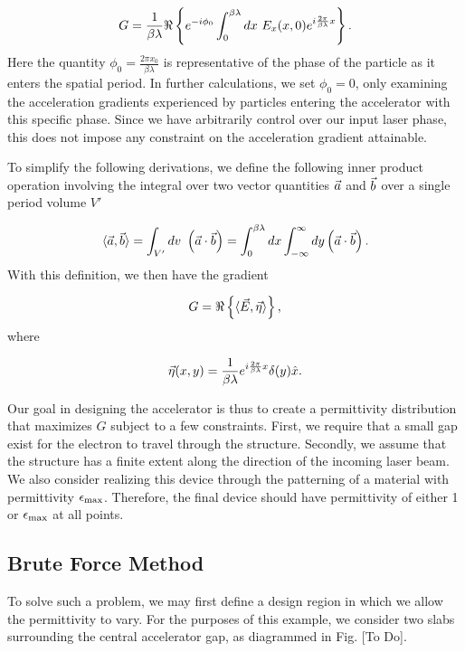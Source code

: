 \begin{equation}
G = \frac{1}{\beta\lambda}\real{ e^{-i\phi_0}\int_0^{\beta\lambda}{dx \ }E_x(x,0)e^{i\frac{2\pi}{\beta\lambda}x}}.
\end{equation}
%
Here the quantity $\phi_0 = \frac{2\pi x_0}{\beta\lambda}$ is representative of the phase of the particle as it enters the spatial period.
In further calculations, we set $\phi_0 = 0$, only examining the acceleration gradients experienced by particles entering the accelerator with this specific phase.
Since we have arbitrarily control over our input laser phase, this does not impose any constraint on the acceleration gradient attainable.

To simplify the following derivations, we define the following inner product operation involving the integral over two vector quantities $\vec{a}$ and $\vec{b}$ over a single period volume $V'$

\begin{equation}
 \langle \vec{a} , \vec{b} \rangle  = \int_{V'} dv \  \left(\vec{a} \cdot \vec{b} \right) = \int_0^{\beta\lambda}dx\int_{-\infty}^\infty dy \left(\vec{a}\cdot\vec{b}\right).
\end{equation} 
With this definition, we then have the gradient

\begin{equation}
G =  \Re \left\{  \langle \vec{E} , \vec{\eta} \rangle  \right\} ,
\label{eq:G}
\end{equation}
where

\begin{equation}
\vec{\eta}(x,y) = \frac{1}{\beta\lambda}e^{i\frac{2\pi}{\beta\lambda}x}\delta(y)\hat{x}.
\end{equation}

Our goal in designing the accelerator is thus to create a permittivity distribution that maximizes $G$ subject to a few constraints.
First, we require that a small gap exist for the electron to travel through the structure.
Secondly, we assume that the structure has a finite extent along the direction of the incoming laser beam.
We also consider realizing this device through the patterning of a material with permittivity $\epsilon_\textrm{max}$.  
Therefore, the final device should have permittivity of either 1 or $\epsilon_\textrm{max}$ at all points.

\subsection{Brute Force Method}

To solve such a problem, we may first define a design region in which we allow the permittivity to vary.
For the purposes of this example, we consider two slabs surrounding the central accelerator gap, as diagrammed in Fig. [To Do].

